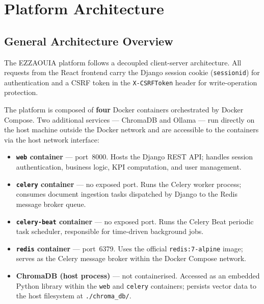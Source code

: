 \section{Platform Architecture}
\begin{sloppypar}

\subsection{General Architecture Overview}

The EZZAOUIA platform follows a decoupled client-server architecture. All
requests from the React frontend carry the Django session cookie
(\texttt{sessionid}) for authentication and a CSRF token in the
\texttt{X-CSRFToken} header for write-operation protection.

The platform is composed of \textbf{four} Docker containers orchestrated by
Docker Compose. Two additional services --- ChromaDB and Ollama --- run directly
on the host machine outside the Docker network and are accessible to the
containers via the host network interface:

\begin{itemize}
  \item \textbf{\texttt{web} container} --- port~8000. Hosts the Django REST
    API; handles session authentication, business logic, KPI computation, and
    user management.

  \item \textbf{\texttt{celery} container} --- no exposed port. Runs the Celery
    worker process; consumes document ingestion tasks dispatched by Django to
    the Redis message broker queue.

  \item \textbf{\texttt{celery-beat} container} --- no exposed port. Runs the
    Celery Beat periodic task scheduler, responsible for time-driven background
    jobs.

  \item \textbf{\texttt{redis} container} --- port~6379. Uses the official
    \texttt{redis:7-alpine} image; serves as the Celery message broker within
    the Docker Compose network.

  \item \textbf{ChromaDB (host process)} --- not containerised. Accessed as an
    embedded Python library within the \texttt{web} and \texttt{celery}
    containers; persists vector data to the host filesystem at
    \texttt{./chroma\_db/}.


\end{itemize}
\end{sloppypar}

